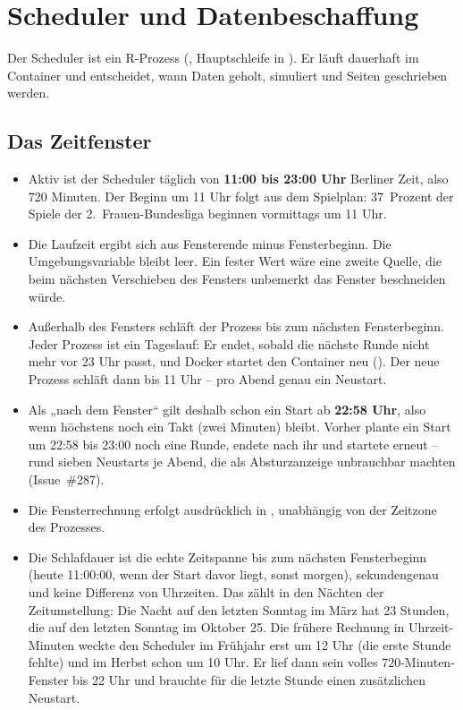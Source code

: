 \chapter{Scheduler und Datenbeschaffung}\label{kap:scheduler}

Der Scheduler ist ein R-Prozess (, Hauptschleife
in ). Er läuft dauerhaft im
Container und entscheidet, wann Daten geholt, simuliert und Seiten
geschrieben werden.

\section{Das Zeitfenster}

\begin{itemize}
  \item Aktiv ist der Scheduler täglich von \textbf{11:00 bis 23:00 Uhr}
        Berliner Zeit, also 720 Minuten. Der Beginn um 11 Uhr folgt aus dem
        Spielplan: 37~Prozent der Spiele der 2.~Frauen-Bundesliga beginnen
        vormittags um 11 Uhr.
  \item Die Laufzeit ergibt sich aus Fensterende minus Fensterbeginn. Die
        Umgebungsvariable  bleibt leer. Ein fester Wert wäre
        eine zweite Quelle, die beim nächsten Verschieben des Fensters
        unbemerkt das Fenster beschneiden würde.
  \item Außerhalb des Fensters schläft der Prozess bis zum nächsten
        Fensterbeginn. Jeder Prozess ist ein Tageslauf: Er endet, sobald die
        nächste Runde nicht mehr vor 23 Uhr passt, und Docker startet den
        Container neu (). Der neue Prozess
        schläft dann bis 11 Uhr -- pro Abend genau ein Neustart.
  \item Als „nach dem Fenster“ gilt deshalb schon ein Start ab
        \textbf{22:58 Uhr}, also wenn höchstens noch ein Takt (zwei Minuten)
        bleibt. Vorher plante ein Start um 22:58 bis 23:00 noch eine Runde,
        endete nach ihr und startete erneut -- rund sieben Neustarts je Abend,
        die  als Absturzanzeige unbrauchbar machten
        (Issue~\#287).
  \item Die Fensterrechnung erfolgt ausdrücklich in ,
        unabhängig von der Zeitzone des Prozesses.
  \item Die Schlafdauer ist die echte Zeitspanne bis zum nächsten
        Fensterbeginn (heute 11:00:00, wenn der Start davor liegt, sonst
        morgen), sekundengenau und keine Differenz von Uhrzeiten. Das zählt
        in den Nächten der Zeitumstellung: Die Nacht auf den letzten Sonntag
        im März hat 23 Stunden, die auf den letzten Sonntag im Oktober 25.
        Die frühere Rechnung in Uhrzeit-Minuten weckte den Scheduler im
        Frühjahr erst um 12 Uhr (die erste Stunde fehlte) und im Herbst
        schon um 10 Uhr. Er lief dann sein volles 720-Minuten-Fenster bis
        22 Uhr und brauchte für die letzte Stunde einen zusätzlichen Neustart.
\end{itemize}

